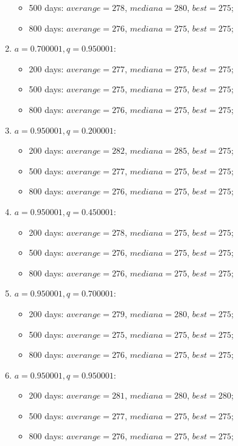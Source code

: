\begin{enumerate}
\begin{itemize}
		\item 500 days: $averange = 278$, $mediana = 280$, $best = 275$;
		\item 800 days: $averange = 276$, $mediana = 275$, $best = 275$;
	\end{itemize}
\item $a= 0.700001, q= 0.950001$:
	\begin{itemize}
		\item 200 days: $averange = 277$, $mediana = 275$, $best = 275$;
		\item 500 days: $averange = 275$, $mediana = 275$, $best = 275$;
		\item 800 days: $averange = 276$, $mediana = 275$, $best = 275$;
	\end{itemize}
\item $a= 0.950001, q= 0.200001$:
	\begin{itemize}
		\item 200 days: $averange = 282$, $mediana = 285$, $best = 275$;
		\item 500 days: $averange = 277$, $mediana = 275$, $best = 275$;
		\item 800 days: $averange = 276$, $mediana = 275$, $best = 275$;
	\end{itemize}
\item $a= 0.950001, q= 0.450001$:
	\begin{itemize}
		\item 200 days: $averange = 278$, $mediana = 275$, $best = 275$;
		\item 500 days: $averange = 276$, $mediana = 275$, $best = 275$;
		\item 800 days: $averange = 276$, $mediana = 275$, $best = 275$;
	\end{itemize}
\item $a= 0.950001, q= 0.700001$:
	\begin{itemize}
		\item 200 days: $averange = 279$, $mediana = 280$, $best = 275$;
		\item 500 days: $averange = 275$, $mediana = 275$, $best = 275$;
		\item 800 days: $averange = 276$, $mediana = 275$, $best = 275$;
	\end{itemize}
\item $a= 0.950001, q= 0.950001$:
	\begin{itemize}
		\item 200 days: $averange = 281$, $mediana = 280$, $best = 280$;
		\item 500 days: $averange = 277$, $mediana = 275$, $best = 275$;
		\item 800 days: $averange = 276$, $mediana = 275$, $best = 275$;
	\end{itemize}
\end{enumerate}
